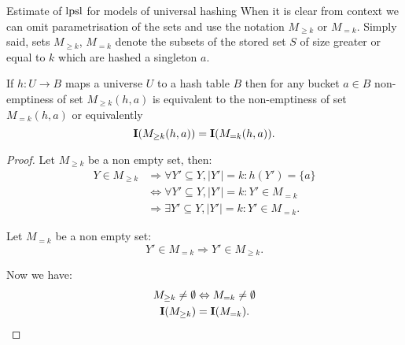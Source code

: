\begin{section}{Estimate of $\mathrm{lpsl}$ for models of universal hashing}
When it is clear from context we can omit parametrisation of the sets and use the notation $M_{\geq k}$ or $M_{= k}$. Simply said, sets $M_{\geq k}$, $M_{= k}$ denote the subsets of the stored set $S$ of size greater or equal to $k$ which are hashed a singleton $a$. 

\begin{lemma}
\label{lemma-indicator-k-collision}
If $h: U \rightarrow B$ maps a universe $U$ to a hash table $B$ then for any bucket $a \in B$ non-emptiness of set $M_{\geq k}(h, a)$ is equivalent to the non-emptiness of set $M_{= k}(h, a)$ or equivalently
\begin{displaymath}
\mathbf{I}(M_{\geq k}(h, a)) = \mathbf{I}(M_{= k}(h, a)) \text{.}
\end{displaymath}
\begin{proof}
Let $M_{\geq k}$ be a non empty set, then:
\begin{displaymath}
\begin{split}
Y \in M_{\geq k} 
	& \Rightarrow \forall Y' \subseteq Y, |Y'| = k: h(Y') = \{a\} \\
	& \Leftrightarrow \forall Y' \subseteq Y, |Y'| = k: Y' \in M_{=k} \\
	& \Rightarrow \exists Y' \subseteq Y, |Y'| = k: Y' \in M_{=k} \text{.}
\end{split}
\end{displaymath}

Let $M_{=k}$ be a non empty set:
\begin{displaymath}
Y' \in M_{=k} \Rightarrow Y' \in M_{\geq k} \text{.}
\end{displaymath}

Now we have:
\begin{displaymath}
\begin{split}
M_{\geq k} \neq \emptyset & \Leftrightarrow  M_{= k} \neq \emptyset \\
\mathbf{I}(M_{\geq k}) & = \mathbf{I}(M_{= k}) \text{.}
\end{split}
\end{displaymath}
\end{proof}
\end{lemma}


\end{section}
